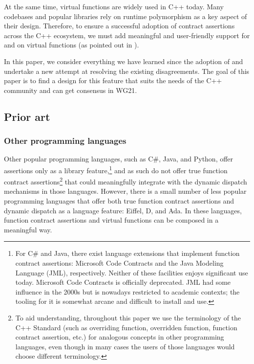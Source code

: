 At the same time, virtual functions are widely used in C++ today. Many codebases and popular libraries rely on runtime polymorphism as a key aspect of their design. Therefore, to ensure a successful adoption of contract assertions across the C++ ecosystem, we must add meaningful and user-friendly support for  and  on virtual functions (as pointed out in \cite{P3173R0}).

In this paper, we consider everything we have learned since the adoption of \cite{P2900R14} and undertake a new attempt at resolving the existing disagreements. The goal of this paper is to find a design for this feature that suits the needs of the C++ community and can get consensus in WG21.

\subsection{Prior art}

\subsubsection{Other programming languages}

Other popular programming languages, such as C\#, Java, and Python, offer assertions only as a library feature,\footnote{For C\# and Java, there exist language extensions that implement function contract assertions: Microsoft Code Contracts and the Java Modeling Language (JML), respectively. Neither of these facilities enjoys significant use today. Microsoft Code Contracts is officially deprecated. JML had some influence in the 2000s but is nowadays restricted to academic contexts; the tooling for it is somewhat arcane and difficult to install and use.} and as such do not offer true function contract assertions\footnote{To aid understanding, throughout this paper we use the terminology of the C++ Standard (such as overriding function, overridden function, function contract assertion, etc.) for analogous concepts in other programming languages, even though in many cases the users of those languages would choose different terminology.} that could meaningfully integrate with the  dynamic dispatch mechanisms in those languages. However, there is a small number of less popular programming languages that offer both true function contract assertions and dynamic dispatch as a language feature: Eiffel, D, and Ada. In these languages, function contract assertions and virtual functions can be composed in a meaningful way.

